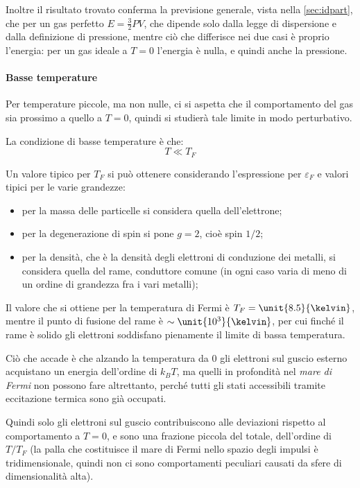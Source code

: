 Inoltre il risultato trovato conferma la previsione generale, vista nella \cref{sec:idpart}, che per un gas perfetto $ E = \frac{3}{2} PV$, che dipende solo dalla legge di dispersione e dalla definizione di pressione, mentre ciò che differisce nei due casi è proprio l'energia: per un gas ideale a $T=0$ l'energia è nulla, e quindi anche la pressione.

\paragraph{Basse temperature} Per temperature piccole, ma non nulle, ci si aspetta che il comportamento del gas sia prossimo a quello a $T=0$, quindi si studierà tale limite in modo perturbativo.

La condizione di basse temperature è che:
\begin{equation*}
T \ll T_F
\end{equation*}

Un valore tipico per $T_F$ si può ottenere considerando l'espressione per $\varepsilon_F$ e valori tipici per le varie grandezze:
\begin{itemize}
	\item per la massa delle particelle si considera quella dell'elettrone;
	\item per la degenerazione di spin si pone $g=2$, cioè spin $1/2$;
	\item per la densità, che è la densità degli elettroni di conduzione dei metalli, si considera quella del rame, conduttore comune (in ogni caso varia di meno di un ordine di grandezza fra i vari metalli);
\end{itemize}
Il valore che si ottiene per la temperatura di Fermi è $T_F = \unit{8.5}{\kelvin}$, mentre il punto di fusione del rame è $\sim \unit{10^3}{\kelvin}$, per cui finché il rame è solido gli elettroni soddisfano pienamente il limite di bassa temperatura.
\newline

Ciò che accade è che alzando la temperatura da $0$ gli elettroni sul guscio esterno acquistano un energia dell'ordine di $k_B T$, ma quelli in profondità nel \textit{mare di Fermi} non possono fare altrettanto, perché tutti gli stati accessibili tramite eccitazione termica sono già occupati.

Quindi solo gli elettroni sul guscio contribuiscono alle deviazioni rispetto al comportamento a $T=0$, e sono una frazione piccola del totale, dell'ordine di $T/T_F$ (la palla che costituisce il mare di Fermi nello spazio degli impulsi è tridimensionale, quindi non ci sono comportamenti peculiari causati da sfere di dimensionalità alta).

